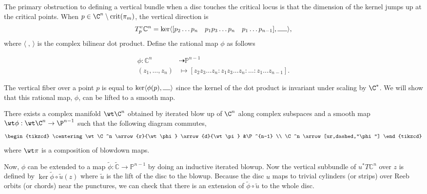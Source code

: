 The primary obstruction to defining a vertical bundle when a disc touches the critical locus is that the dimension of the kernel jumps up at the critical points. When $p\in \C^n \setminus \text{crit}(\pi_m)$, the vertical direction is $$T^v_p\mathbb C^n = \ker \langle [p_2\dots p_n \quad p_1p_3\dots p_n \quad p_1\dots p_{n-1}], \rule{0.5cm}{0.15mm}\rangle, $$ where $\langle \;, \, \rangle$ is the complex bilinear dot product. Define the rational map $\phi$ as follows

\begin{align*}
    \phi : \mathbb C^n &\dashrightarrow \mathbb P^{n-1}\\
    (z_1,\dots,z_n)&\mapsto [z_2z_3\dots z_n : z_1z_3\dots z_n:\dots : z_1\dots z_{n-1}].
\end{align*}

\noindent The vertical fiber over a point $p$ is equal to $\ker \langle \phi (p), \rule{0.4cm}{0.15mm} \rangle$ since the kernel of the dot product is invariant under scaling by $\C^*$. We will show that this rational map, $\phi$, can be lifted to a smooth map.

\begin{Theorem}
There exists a complex manifold $\wt \C^n$ obtained by iterated blow up of $\C^n$ along complex subspaces and a smooth map $\wt \phi: \wt \C^n \to \P^{n-1}$ such that  the following diagram commutes,
$$\begin{tikzcd}
\centering
        \wt \C^n \arrow{r}{\wt \phi}  \arrow{d}{\wt \pi} &\P^{n-1} \\
        \C^n \arrow[ur,dashed,"\phi"]
\end{tikzcd}
$$
where $\wt \pi$ is a composition of blowdown maps.
\end{Theorem}

 Now, $\phi$ can be extended to a map $\widetilde \phi : \widetilde{\mathbb{C}} \rightarrow \mathbb P^{n-1}$ by doing an inductive iterated blowup. Now the vertical subbundle of $u^*T\mathbb C^n $  over $z $ is defined by $\ker \widetilde\phi \circ \widetilde u (z)$ where $\widetilde u$ is the lift of the disc to the blowup. Because the disc $u$ maps to trivial cylinders (or strips) over Reeb orbits (or  chords) near the punctures, we can check that there is an extension of $\widetilde \phi \circ \widetilde u $ to the whole disc. 


